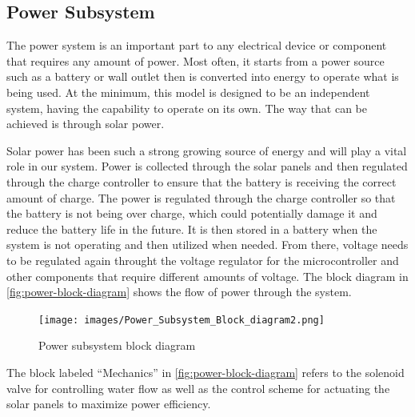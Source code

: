 \subsection{Power Subsystem}
\label{sec:power_subsystem}
The power system is an important part to any electrical device or component that requires any amount of power. Most often, it starts from a power source such as a battery or wall outlet then is converted into energy to operate what is being used. At the minimum, this model is designed to be an independent system, having the capability to operate on its own. The way that can be achieved is through solar power. \par
Solar power has been such a strong growing source of energy and will play a vital role in our system. Power is collected through the solar panels and then regulated through the charge controller to ensure that the battery is receiving the correct amount of charge. The power is regulated through the charge controller so that the battery is not being over charge, which could potentially damage it and reduce the battery life in the future. It is then stored in a battery when the system is not operating and then utilized when needed. From there, voltage needs to be regulated again throught the voltage regulator for the microcontroller and other components that require different amounts of voltage. The block diagram in \autoref{fig:power-block-diagram} shows the flow of power through the system. 

\begin{figure}[H]
    \centering
    \caption{Power subsystem block diagram}
    \texttt{[image: images/Power\_Subsystem\_Block\_diagram2.png]}
    \label{fig:power-block-diagram}
\end{figure}
The block labeled ``Mechanics'' in \autoref{fig:power-block-diagram} refers to the solenoid valve for controlling water flow as well as the control scheme for actuating the solar panels to maximize power efficiency.
